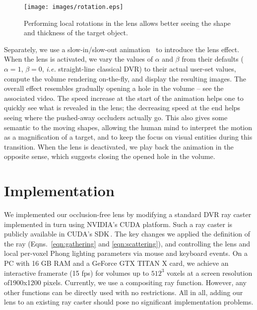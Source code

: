 \begin{figure}[htbp!]
\centering
\texttt{[image: images/rotation.eps]}
\vspace{-0.15cm}
\caption{Performing local rotations in the lens allows better seeing the shape and thickness of the target object.}
\label{f:rotation}
\vspace{-0.15cm}
\end{figure}



Separately, we use a slow-in/slow-out animation~\cite{Dragicevic:2011:TDA:1978942.1979233} to introduce the lens effect. When the lens is activated, we vary the values of $\alpha$ and $\beta$ from their defaults ($\alpha=1$, $\beta=0$, \emph{i.e.} straight-line classical DVR) to their actual user-set values, compute the volume rendering on-the-fly, and display the resulting images. The overall effect resembles gradually opening a hole in the volume -- see the associated video. The speed increase at the start of the animation helps one to quickly see what is revealed in the lens; the decreasing speed at the end helps seeing where the pushed-away occluders actually go. This also gives some semantic to the moving shapes, allowing the human mind to interpret the motion as a magnification of a target, and to keep the focus on visual entities during this transition. When the lens is deactivated, we play back the animation in the opposite sense, which suggests closing the opened hole in the volume.

\section{Implementation}
\label{sec:implem}
%
We implemented our occlusion-free lens by modifying a standard DVR ray caster implemented in turn using NVIDIA's CUDA platform. Such a ray caster is publicly available in CUDA's SDK\,\cite{cudasdk}. The key changes we applied the definition of the ray (Eqns.~\ref{eqn:gathering} and \ref{eqn:scattering}), and controlling the lens and local per-voxel Phong lighting parameters via mouse and keyboard events. On a PC with 16 GB RAM and a GeForce GTX TITAN X card, we achieve an interactive framerate (15 fps) for volumes up to $512^3$ voxels at a screen resolution of1900x1200 pixels. Currently, we use a compositing ray function. However, any other functions can be directly used with no restrictions. All in all, adding our lens to an existing ray caster should pose no significant implementation problems.

